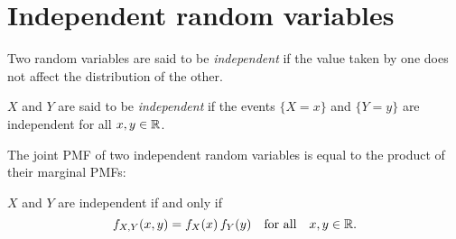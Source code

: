 \section{Independent random variables}
Two random variables are said to be \emph{independent} if the value taken by one does not affect the distribution of the other.%




\begin{definition}
$X$ and $Y$ are said to be \emph{independent} if the events $\{X = x\}$ and $\{Y = y\}$ are independent for all $x,y\in\mathbb{R}$.
\end{definition}

The joint PMF of two independent random variables is equal to the product of their marginal PMFs:
\begin{lemma}
$X$ and $Y$ are independent if and only if
\[
f_{X,Y}(x,y) = f_X(x)\,f_Y(y) \quad\text{for all}\quad x,y\in\mathbb{R}.
\]
\end{lemma}


